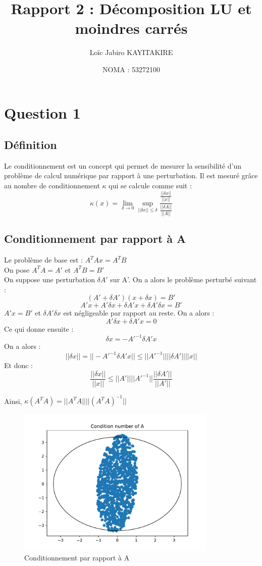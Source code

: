 \documentclass[11pt]{article}
\title{Rapport 2 : Décomposition LU et moindres carrés}
\author{Loïc Jabiro KAYITAKIRE}
\date{NOMA : 53272100}
\begin{document}
\maketitle

\section*{Question 1}

\subsection*{Définition}
Le conditionnement est un concept qui permet de mesurer la sensibilité d'un problème de calcul numérique par rapport à une perturbation. 
Il est mesuré grâce au nombre de conditionnement $ \kappa $ qui se calcule comme suit :
$$ \kappa(x) = \lim_{\delta \to 0}   \sup_{||\delta x|| \leq \delta}   \frac{\frac{||\delta x||}{||x||}}{\frac{||\delta A||}{||A||}} $$

\subsection*{Conditionnement par rapport à A}

Le problème de base est : $A^T A x = A^T B$
\\
On pose $A^T A = A'$ et $A^T B = B'$
\\
On suppose une perturbation $ \delta A' $ sur A'. On a alors le problème perturbé suivant : 
$$ (A' + \delta A') (x + \delta x) = B' $$
$$ A'x + A'\delta x + \delta A'x + \delta A' \delta x = B' $$
$ A'x = B'$ et $ \delta A' \delta x$ est négligeable par rapport au reste. On a alors :
$$ A'\delta x + \delta A' x = 0 $$
Ce qui donne ensuite :
$$ \delta x = -A'^{-1} \delta A' x $$
On a alors :
$$ ||\delta x|| = ||-A'^{-1} \delta A' x|| \leq ||A'^{-1}|| ||\delta A'|| ||x|| $$
Et donc :
$$ \frac{||\delta x||}{||x||} \leq ||A'||||A'^{-1}|| \frac{||\delta A'||}{||A'||} $$

Ainsi, $ \kappa(A^T A) = ||A^T A||||(A^T A)^{-1}|| $ 

\begin{figure}[ht]
\centering
\includegraphics[width=0.85\textwidth]{images/condition_A.pdf}
\caption{Conditionnement par rapport à A}
\end{figure}
\end{document}
